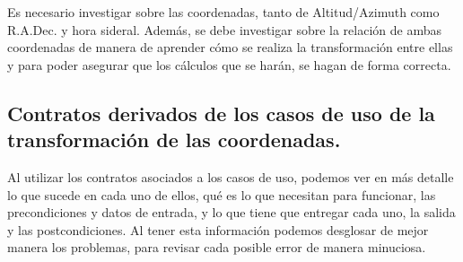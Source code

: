 \documentclass[letterpaper,spanish,10pt]{article}
\begin{document}
Es necesario investigar sobre las coordenadas, tanto de Altitud/Azimuth como R.A.Dec. y hora sideral. Adem\'as, se debe investigar sobre la relaci\'on de ambas coordenadas de manera de aprender c\'omo se realiza la transformaci\'on entre ellas y para poder asegurar que los c\'alculos que se har\'an, se hagan de forma correcta.

\subsection{Contratos derivados de los casos de uso de la transformaci\'on de las coordenadas.}

Al utilizar los contratos asociados a los casos de uso, podemos ver en m\'as detalle lo que sucede en cada uno de ellos, qu\'e es lo que necesitan para funcionar, las precondiciones y datos de entrada, y lo que tiene que entregar cada uno, la salida y las postcondiciones. Al tener esta informaci\'on podemos desglosar de mejor manera los problemas, para revisar cada posible error de manera minuciosa.
\end{document}
